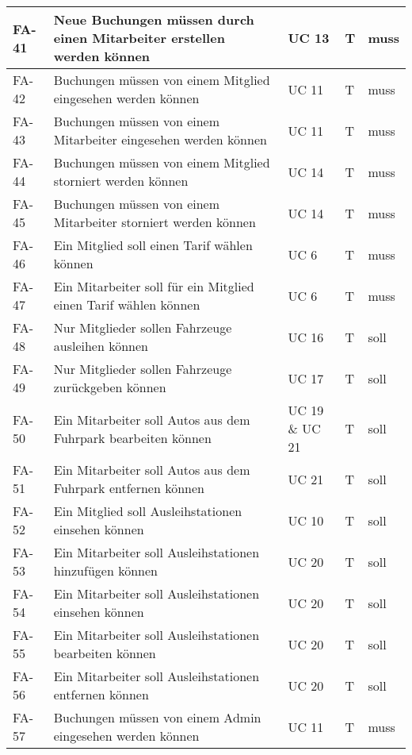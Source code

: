 \begin{longtable}{|m{1.5cm}|m{5.5cm}|P{3cm}|P{2cm}|P{1cm}|}
        FA-41           & Neue Buchungen müssen durch einen Mitarbeiter erstellen werden können & UC 13 & T & muss \\
        \hline
        FA-42           & Buchungen müssen von einem Mitglied eingesehen werden können & UC 11 & T & muss \\
        \hline
        FA-43           & Buchungen müssen von einem Mitarbeiter eingesehen werden können & UC 11 & T & muss \\
        \hline
        FA-44           & Buchungen müssen von einem Mitglied storniert werden können & UC 14 & T & muss \\
        \hline
        FA-45           & Buchungen müssen von einem Mitarbeiter storniert werden können & UC 14 & T & muss \\
        \hline
        FA-46           & Ein Mitglied soll einen Tarif wählen können & UC 6 & T & muss \\
        \hline
        FA-47           & Ein Mitarbeiter soll für ein Mitglied einen Tarif wählen können & UC 6 & T & muss \\
        \hline
        FA-48           & Nur Mitglieder sollen Fahrzeuge ausleihen können & UC 16 & T & soll \\
        \hline
        FA-49           & Nur Mitglieder sollen Fahrzeuge zurückgeben können & UC 17 & T & soll \\
        \hline
        FA-50           & Ein Mitarbeiter soll Autos aus dem Fuhrpark bearbeiten können & UC 19 \& UC 21 & T & soll\\
        \hline
        FA-51           & Ein Mitarbeiter soll Autos aus dem Fuhrpark entfernen können & UC 21 & T & soll\\
        \hline
        FA-52           & Ein Mitglied soll Ausleihstationen einsehen können & UC 10 & T & soll \\
        \hline
        FA-53           & Ein Mitarbeiter soll Ausleihstationen hinzufügen können & UC 20 & T & soll \\
        \hline
        FA-54           & Ein Mitarbeiter soll Ausleihstationen einsehen können & UC 20 & T & soll \\
        \hline
        FA-55           & Ein Mitarbeiter soll Ausleihstationen bearbeiten können & UC 20 & T & soll \\
        \hline
        FA-56           & Ein Mitarbeiter soll Ausleihstationen entfernen können & UC 20 & T & soll \\
        \hline
        FA-57           & Buchungen müssen von einem Admin eingesehen werden können & UC 11 & T & muss \\

\end{longtable}
